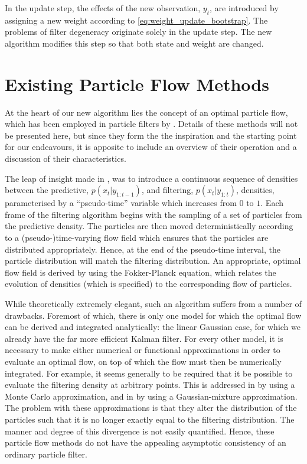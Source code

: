 \documentclass[a4paper,10pt]{article}
\newcommand{\rt}{t}                             %
\newcommand{\ls}[1]{x_{#1}}                     %
\newcommand{\ob}[1]{y_{#1}}                     %
\begin{document}
In the update step, the effects of the new observation, $\ob{\rt}$, are introduced by assigning a new weight according to \eqref{eq:weight_update_bootstrap}. The problems of filter degeneracy originate solely in the update step. The new algorithm modifies this step so that both state and weight are changed.



\section{Existing Particle Flow Methods}

At the heart of our new algorithm lies the concept of an optimal particle flow, which has been employed in particle filters by \cite{Daum2008,Daum2011d,Reich2011}. Details of these methods will not be presented here, but since they form the the inspiration and the starting point for our endeavours, it is apposite to include an overview of their operation and a discussion of their characteristics.

The leap of insight made in \cite{Daum2008}, was to introduce a continuous sequence of densities between the predictive, $p(\ls{\rt}|\ob{1:\rt-1})$, and filtering, $p(\ls{\rt}|\ob{1:\rt})$, densities, parameterised by a ``pseudo-time'' variable which increases from $0$ to $1$. Each frame of the filtering algorithm begins with the sampling of a set of particles from the predictive density. The particles are then moved deterministically according to a (pseudo-)time-varying flow field which ensures that the particles are distributed appropriately. Hence, at the end of the pseudo-time interval, the particle distribution will match the filtering distribution. An appropriate, optimal flow field is derived by using the Fokker-Planck equation, which relates the evolution of densities (which is specified) to the corresponding flow of particles.

While theoretically extremely elegant, such an algorithm suffers from a number of drawbacks. Foremost of which, there is only one model for which the optimal flow can be derived and integrated analytically: the linear Gaussian case, for which we already have the far more efficient Kalman filter. For every other model, it is necessary to make either numerical or functional approximations in order to evaluate an optimal flow, on top of which the flow must then be numerically integrated. For example, it seems generally to be required that it be possible to evaluate the filtering density at arbitrary points. This is addressed in \cite{Daum2012} by using a Monte Carlo approximation, and in \cite{Reich2012a} by using a Gaussian-mixture approximation. The problem with these approximations is that they alter the distribution of the particles such that it is no longer exactly equal to the filtering distribution. The manner and degree of this divergence is not easily quantified. Hence, these particle flow methods do not have the appealing asymptotic consistency of an ordinary particle filter.
\end{document}
